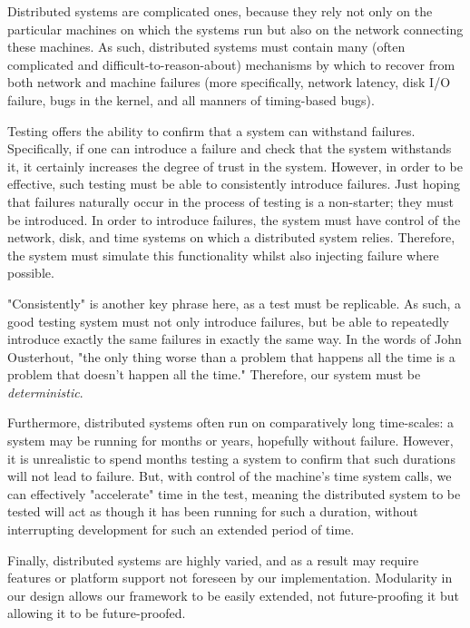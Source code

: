 {\fontsize{12}{15}\selectfont 
Distributed systems are complicated ones,
because they rely not only on the particular machines
on which the systems run but also on the network connecting these machines.
As such, distributed systems must contain many
(often complicated and difficult-to-reason-about)
mechanisms by which to recover from both network and machine failures
(more specifically, network latency, disk I/O failure, bugs in the kernel,
and all manners of timing-based bugs).

Testing offers the ability to confirm that a system can withstand failures.
Specifically, if one can introduce a failure and check that the system withstands it,
it certainly increases the degree of trust in the system.
However, in order to be effective,
such testing must be able to consistently introduce failures.
Just hoping that failures naturally occur in the process of testing is a non-starter;
they must be introduced.
In order to introduce failures, the system must have control of the network, disk,
and time systems on which a distributed system relies.
Therefore, the system must simulate this functionality whilst also injecting failure where possible.

"Consistently" is another key phrase here,
as a test must be replicable.
As such,
a good testing system must not only introduce failures,
but be able to repeatedly introduce exactly the same failures in exactly the same way.
In the words of John Ousterhout,
"the only thing worse than a problem that happens all the time is a problem that doesn't happen all the time."
Therefore, our system must be \textit{deterministic}.

Furthermore,
distributed systems often run on comparatively long time-scales:
a system may be running for months or years,
hopefully without failure.
However,
it is unrealistic to spend months testing a system to confirm that such durations will not lead to failure.
But, with control of the machine's time system calls,
we can effectively "accelerate" time in the test,
meaning the distributed system to be tested will act as though it has been running for such a duration,
without interrupting development for such an extended period of time.

Finally,
distributed systems are highly varied,
and as a result may require features or platform support not foreseen by our implementation.
Modularity in our design allows our framework to be easily extended,
not future-proofing it but allowing it to be future-proofed.
}

